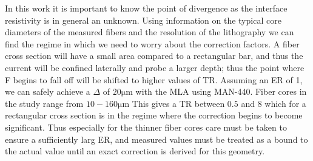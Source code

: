In this work it is important to know the point of divergence as the interface resistivity is in general an unknown. Using information on the typical core diameters of the measured fibers and the resolution of the lithography we can find the regime in which we need to worry about the correction factors. A fiber cross section will have a small area compared to a rectangular bar, and thus the current will be confined laterally and probe a larger depth; thus the point where F begins to fall off will be shifted to higher values of TR. Assuming an ER of 1, we can safely achieve a $\Delta$ of $20\si{\micro\meter}$ with the MLA using MAN-440. Fiber cores in the study range from  $10-160 \si{\micro\meter}$ This gives a TR between $0.5$ and $8$ which for a rectangular cross section is in the regime where the correction begins to become significant. Thus especially for the thinner fiber cores care must be taken to ensure a sufficiently larg ER, and measured values must be treated as a bound to the actual value until an exact correction is derived for this geometry.  

\cleardoublepage
